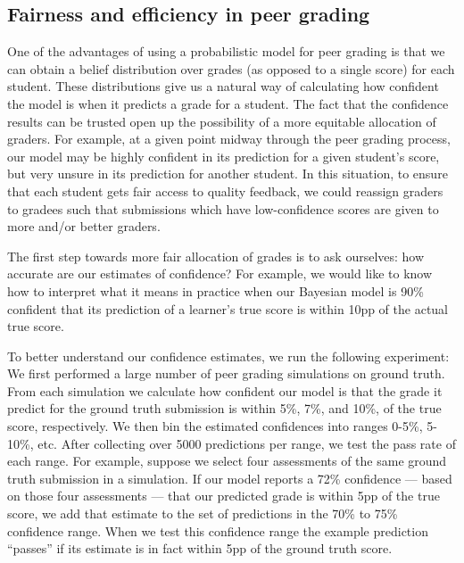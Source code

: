 \subsection{Fairness and efficiency in peer grading}
One of the advantages of using a probabilistic model for peer grading is
that we can obtain a belief distribution over grades (as opposed to a single score) for each student. These distributions give us a natural way of calculating how confident the model is when it predicts a grade for a student.
 The fact that the confidence results can be trusted
 open up the possibility of a more equitable allocation of graders. For example, at a given point midway through the peer grading process, our model may be highly confident
in its prediction for a given student's score, but very unsure in its prediction for another student. In this situation, to ensure that each student
gets fair access to quality feedback, we could reassign graders
to gradees such that submissions which have low-confidence
scores are given to more and/or better graders.

The first step towards more fair allocation of grades is to ask ourselves: how accurate are our
estimates of confidence?
For example, we would like to know how to interpret what it means in practice when our Bayesian
model is 90\% confident that its prediction of a learner's true score is within 10pp of the actual true score.

To better understand our confidence estimates, we run the following experiment: We first performed a large number of
peer grading simulations on ground truth. From each
simulation we calculate how confident our model is that
the grade it predict for the ground truth submission is
within 5\%, 7\%, and 10\%, of the true score, respectively. 
We then bin the estimated confidences into ranges 0-5\%, 5-10\%, etc.
After collecting over 5000 predictions per range, 
we test the pass rate of each range. For example, suppose we select four assessments of the same ground truth submission in a simulation. If our model reports a 72\% confidence --- based on those four assessments --- that our predicted grade is within 5pp
of the true score, we
add that estimate to the set of predictions in the 70\% to 75\%
confidence range. When we test this confidence range the example prediction ``passes'' if its estimate is in fact within 5pp of the ground truth score.

